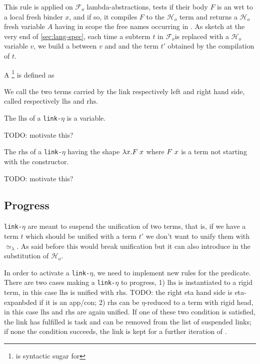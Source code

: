 \documentclass[sigconf,natbib=false,review]{acmart}
\newcommand{\appsep}{\ensuremath{\textcolor{lightgray}{\cdot}}}
\newcommand{\UnifRel}{\ensuremath{\simeq}}
\newcommand{\Ue}{\ensuremath{\UnifRel_\lambda}\xspace}
\newcommand{\linketa}{\texttt{link-}\ensuremath{\eta}\xspace}
\newcommand{\Fo}{\ensuremath{\mathcal{F}_{\!o}\xspace}} %
\newcommand{\Ho}{\ensuremath{\mathcal{H}_o}\xspace}
\begin{document}


This rule is applied on \Fo{} lambda-abstractions, tests if their body $F$ is an
\maybeeta wrt to a local fresh binder $x$, and if so, it compiles $F$ to the \Ho
term  and returns a \Ho fresh variable $A$ having in scope the free
names occurring in . As sketch at the very end of
\cref{sec:lang-spec}, each time a subterm $t$ in \Fo is replaced with a \Ho
variable $v$, we build a  between $v$ and and the term $t'$
obtained by the compilation of $t$.

A \footnote{ is syntactic sugar for
}
is defined as


\newcommand{\lhs}{\ensuremath{\mathrm{lhs}}\xspace}
\newcommand{\rhs}{\ensuremath{\mathrm{rhs}}\xspace}

\noindent
We call the two terms carried by the link respectively left and right hand side,
called respectively \lhs and \rhs.

\begin{invariant}[\linketa \lhs]
  The \lhs of a \linketa is a variable.
  \label{invariant:link-eta-left}
\end{invariant}

TODO: motivate this?

\begin{invariant}[\linketa \rhs]
  The \rhs of a \linketa having the shape $\lambda x.F \appsep x$
  where $F \appsep x$ is a term not starting with the  constructor.
  \label{invariant:link-eta-right}
\end{invariant}

TODO: motivate this?

\subsection{Progress}

\linketa are meant to suspend the unification of two terms, that is, if we have
a \maybeeta term $t$ which should be unified with a term $t'$ we don't want to
unify them with \Ue. As said before this would break unification but it can also
introduce \maybeeta in the substitution of \Ho.

In order to activate a \linketa, we need to implement new rules for the
 predicate. There are two cases making a \linketa to progress,
1) \lhs is instantiated to a rigid term, in this case \lhs is unified with \rhs.
TODO: the right eta hand side is eta-expanbded if it is an app/con; 2) \rhs can
be $\eta$-reduced to a term with rigid head, in this case \lhs and \rhs are
again unified. If one of these two condition is satisfied, the link has
fulfilled is task and can be removed from the list of suspended links; if none
the condition succeeds, the link is kept for a further iteration of
.
\end{document}
